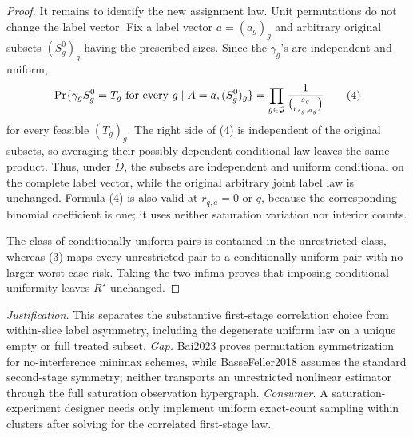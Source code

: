 \documentclass{article}
\begin{document}
\begin{proof}
It remains to identify the new assignment law.  Unit permutations do not change the label vector.  Fix a label vector \(a=(a_g)_g\) and arbitrary original subsets \((S_g^0)_g\) having the prescribed sizes.  Since the \(\gamma_g\)'s are independent and uniform,
\[
 \Pr\{\gamma_gS_g^0=T_g\text{ for every }g\mid A=a,(S_g^0)_g\}
   =\prod_{g\in\mathcal G}{1\over\binom{s_g}{r_{s_g,a_g}}}                 \tag{4}
\]
for every feasible \((T_g)_g\).  The right side of (4) is independent of the original subsets, so averaging their possibly dependent conditional law leaves the same product.  Thus, under \(\widetilde D\), the subsets are independent and uniform conditional on the complete label vector, while the original arbitrary joint label law is unchanged.  Formula (4) is also valid at \(r_{q,a}=0\) or \(q\), because the corresponding binomial coefficient is one; it uses neither saturation variation nor interior counts.

The class of conditionally uniform pairs is contained in the unrestricted class, whereas (3) maps every unrestricted pair to a conditionally uniform pair with no larger worst-case risk.  Taking the two infima proves that imposing conditional uniformity leaves \(R^\star\) unchanged.
\end{proof}
\par\smallskip\noindent \textit{Justification.} This separates the substantive first-stage correlation choice from within-slice label asymmetry, including the degenerate uniform law on a unique empty or full treated subset. \textit{Gap.} Bai2023 proves permutation symmetrization for no-interference minimax schemes, while BasseFeller2018 assumes the standard second-stage symmetry; neither transports an unrestricted nonlinear estimator through the full saturation observation hypergraph. \textit{Consumer.} A saturation-experiment designer needs only implement uniform exact-count sampling within clusters after solving for the correlated first-stage law.
\end{document}
